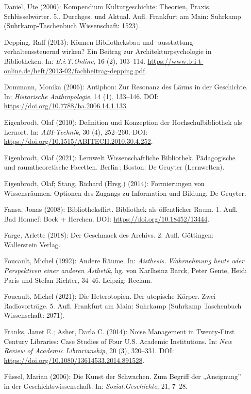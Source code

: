 \documentclass[a4paper,
fontsize=11pt,
oneside,
numbers=noperiodatend,
parskip=half-,
bibliography=totoc,
final
]{scrartcl}
\begin{document}
Daniel, Ute (2006): Kompendium Kulturgeschichte: Theorien, Praxis,
Schlüsselwörter. 5., Durchges. und Aktual. Aufl. Frankfurt am Main:
Suhrkamp (Suhrkamp-Taschenbuch Wissenschaft: 1523).

Depping, Ralf (2013): Können Bibliotheksbau und -ausstattung
verhaltenssteuernd wirken? Ein Beitrag zur Architekturpsychologie in
Bibliotheken. In: \emph{B.i.T.Online}, 16 (2), 103--114.
\url{https://www.b-i-t-online.de/heft/2013-02/fachbeitrag-depping.pdf}.

Dommann, Monika (2006): Antiphon: Zur Resonanz des Lärms in der
Geschichte. In: \emph{Historische Anthropologie}, 14 (1), 133--146. DOI:
\url{https://doi.org/10.7788/ha.2006.14.1.133}.

Eigenbrodt, Olaf (2010): Definition und Konzeption der
Hochschulbibliothek als Lernort. In: \emph{ABI-Technik}, 30 (4),
252--260. DOI: \url{https://doi.org/10.1515/ABITECH.2010.30.4.252}.

Eigenbrodt, Olaf (2021): Lernwelt Wissenschaftliche Bibliothek.
Pädagogische und raumtheoretische Facetten. Berlin\,; Boston: De Gruyter
(Lernwelten).

Eigenbrodt, Olaf; Stang, Richard (Hrsg.) (2014): Formierungen von
Wissensräumen. Optionen des Zugangs zu Information und Bildung. De
Gruyter.

Fansa, Jonas (2008): Bibliotheksflirt. Bibliothek als öffentlicher Raum.
1. Aufl. Bad Honnef: Bock + Herchen. DOI:
\url{https://doi.org/10.18452/13444}.

Farge, Arlette (2018): Der Geschmack des Archivs. 2. Aufl. Göttingen:
Wallerstein Verlag.

Foucault, Michel (1992): Andere Räume. In: \emph{Aisthesis. Wahrnehmung
heute oder Perspektiven einer anderen Ästhetik}, hg. von Karlheinz
Barck, Peter Gente, Heidi Paris und Stefan Richter, 34--46. Leipzig:
Reclam.

Foucault, Michel (2021): Die Heterotopien. Der utopische Körper. Zwei
Radiovorträge. 5. Aufl. Frankfurt am Main: Suhrkamp (Suhrkamp
Taschenbuch Wissenschaft: 2071).

Franks, Janet E.; Asher, Darla C. (2014): Noise Management in
Twenty-First Century Libraries: Case Studies of Four U.S. Academic
Institutions. In: \emph{New Review of Academic Librarianship}, 20 (3),
320--331. DOI: \url{https://doi.org/10.1080/13614533.2014.891528}.

Füssel, Marian (2006): Die Kunst der Schwachen. Zum Begriff der
„Aneignung'' in der Geschichtswissenschaft. In:
\emph{Sozial.Geschichte}, 21, 7--28.
\end{document}
